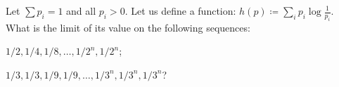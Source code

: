 Let $\sum p_i = 1$ and all $p_i > 0$. Let us define a function: $h(p) \coloneqq
\sum\limits_{i} p_i \log \frac{1}{p_i}$. What is the limit of its value on the following sequences:
\begin{enumlet}
    \item $1 / 2, 1 / 4, 1 / 8, \dots, 1 / 2^n, 1 / 2^n$;
    \item $1 / 3, 1 / 3, 1 / 9, 1 / 9, \dots, 1 / 3^n, 1 / 3^n, 1 / 3^n$?
\end{enumlet}